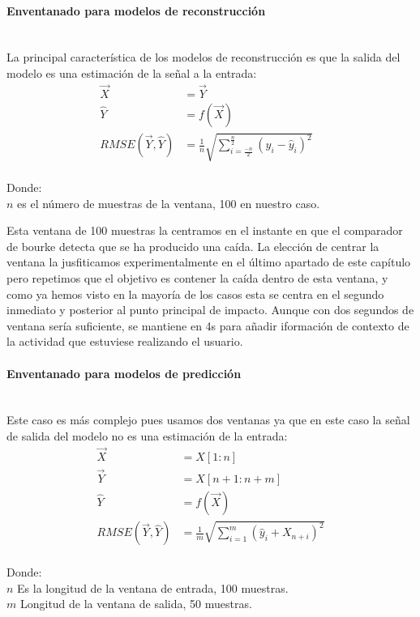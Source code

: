 \paragraph{Enventanado para modelos de reconstrucción}\\
La principal característica de los modelos de reconstrucción es que la salida del modelo es una estimación de la señal a la entrada:
\[
    \begin{array}{rll}
      \vec{X} & = \vec{Y} & \\
      \hat{Y} & = f(\vec{X}) & \\
      RMSE(\vec{Y},\hat{Y}) & = \frac{1}{n}\sqrt{\sum_{i =\frac{-n}{2}}^\frac{n}{2}(y_i-\hat{y}_i)^2 } &
    \end{array}
\]\\
Donde:\\
$n$ es el número de muestras de la ventana, 100 en nuestro caso.

Esta ventana de 100 muestras la centramos en el instante en que el comparador de bourke detecta que se ha producido una caída. La elección de centrar la ventana la jusfiticamos experimentalmente en el último apartado de este capítulo pero repetimos que el objetivo es contener  la caída dentro de esta ventana, y como ya hemos visto en la mayoría de los casos esta se centra en el segundo inmediato y posterior al punto principal de impacto. Aunque con dos segundos de ventana sería suficiente, se mantiene en 4s para añadir iformación de contexto de la actividad que estuviese realizando el usuario.  

\paragraph{Enventanado para modelos de predicción}\\
Este caso es más complejo pues usamos dos ventanas ya que en este caso la señal de salida del modelo no es una estimación de la entrada:
\[
    \begin{array}{rl}
    \vec{X} & = X[1:n] \\
    \vec{Y} & = X[n+1:n+m] \\
    \hat{Y} & = f(\vec{X})\\
    RMSE(\vec{Y},\hat{Y}) & =\frac{1}{m}\sqrt{\sum_{i=1}^m(\hat{y}_i+X_{n+i})^2 }
  \end{array}
\]\\
Donde:\\
$n$ Es la longitud de la ventana de entrada, 100 muestras.\\
$m$ Longitud de la ventana de salida, 50 muestras.

